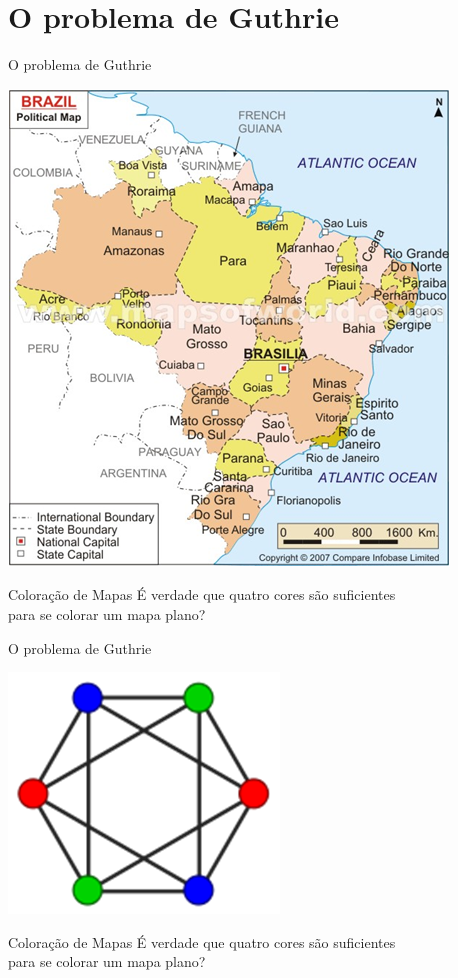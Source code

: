\documentclass[xcolor=dvipsnames,table]{beamer}
\begin{document}
	\section{O problema de Guthrie}
	\begin{frame}[shrink]{O problema de Guthrie}
		\begin{center}
    		\includegraphics[height=.6\textheight]{images/mapa.png}
  		\end{center} \pause
		\begin{alertblock}{Coloração de Mapas} \pause
			É verdade que quatro cores são suficientes \\
			para se colorar um mapa plano?
		\end{alertblock}
	\end{frame}
	
	\begin{frame}[shrink]{O problema de Guthrie}
		\begin{center}
    		\includegraphics[height=.6\textheight]{images/grafoColorido.png}
  		\end{center}
		\begin{alertblock}{Coloração de Mapas}
			É verdade que quatro cores são suficientes \\
			para se colorar um mapa plano?
		\end{alertblock}
	\end{frame}
	
\end{document}
